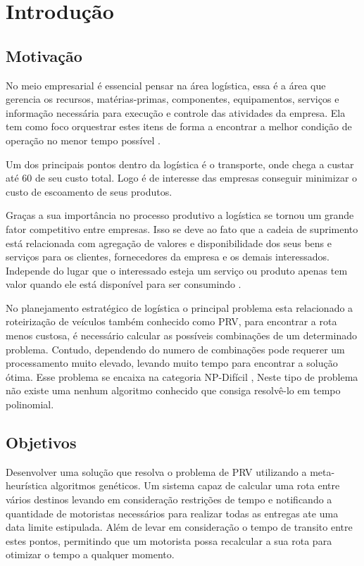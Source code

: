 
\chapter[Introdução]{Introdução}

\section{Motivação}

No meio empresarial é essencial pensar na área logística, essa é a área que gerencia os recursos,
matérias-primas, componentes, equipamentos, serviços e informação necessária para execução e 
controle das atividades da empresa. Ela tem como foco orquestrar estes itens de forma a encontrar
a melhor condição de operação no menor tempo possível \cite{DIAS}.

Um dos principais pontos dentro da logística é o transporte, onde chega a custar até 60%
de seu custo total.\cite{RODRIGUES} Logo é de interesse das empresas conseguir minimizar o custo de escoamento de seus produtos.

Graças a sua importância no processo produtivo a logística se tornou um grande fator competitivo entre empresas.
Isso se deve ao fato que a cadeia de suprimento está relacionada com agregação de valores e disponibilidade dos seus bens e
serviços para os clientes, fornecedores da empresa e os demais interessados. Independe do lugar que o interessado esteja um serviço ou produto apenas tem valor quando ele está disponível para ser consumindo \cite{TSUDA}.

No planejamento estratégico de logística o principal problema esta relacionado a roteirização de veículos \cite{TSUDA} também conhecido como PRV, para encontrar a rota menos custosa, é necessário calcular as possíveis combinações de um determinado problema. Contudo, dependendo do numero de combinações pode requerer um processamento muito elevado, levando muito tempo para encontrar a solução ótima. Esse problema se encaixa na categoria NP-Difícil \cite{CUNHA}, Neste tipo de problema não existe uma nenhum algoritmo conhecido que consiga resolvê-lo em tempo polinomial.

\section{Objetivos}

Desenvolver uma solução que resolva o problema de PRV utilizando a meta-heurística algoritmos genéticos. Um sistema capaz de calcular uma rota entre vários destinos 
levando em consideração restrições de tempo e notificando a quantidade de motoristas necessários para realizar todas as entregas ate uma data limite estipulada. Além de levar  
em consideração o tempo de transito entre estes pontos, permitindo que um motorista possa recalcular a sua rota para otimizar o tempo a qualquer momento.

